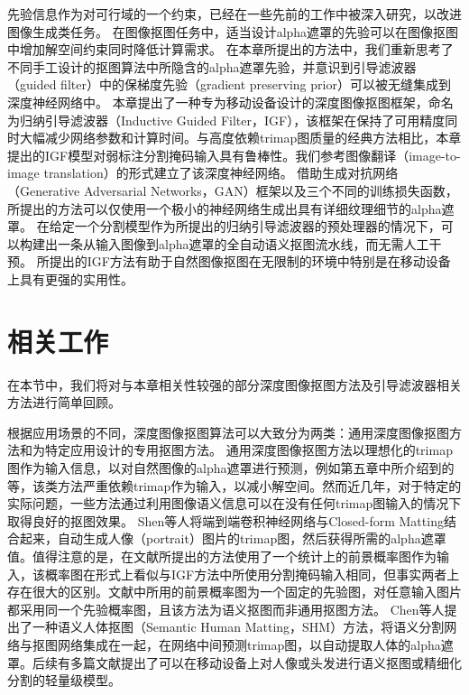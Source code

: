 先验信息作为对可行域的一个约束，已经在一些先前的工作中被深入研究，以改进图像生成类任务\cite{ulyanov2018deep}。
在图像抠图任务中，适当设计alpha遮罩的先验可以在图像抠图中增加解空间约束同时降低计算需求。
在本章所提出的方法中，我们重新思考了不同手工设计的抠图算法中所隐含的alpha遮罩先验，并意识到引导滤波器（guided filter）\cite{he2010guided}中的保梯度先验（gradient preserving prior）可以被无缝集成到深度神经网络中。
本章提出了一种专为移动设备设计的深度图像抠图框架，命名为归纳引导滤波器（Inductive Guided Filter，IGF），该框架在保持了可用精度同时大幅减少网络参数和计算时间。与高度依赖trimap图质量的经典方法相比，本章提出的IGF模型对弱标注分割掩码输入具有鲁棒性。我们参考图像翻译（image-to-image translation）的形式建立了该深度神经网络。
借助生成对抗网络（Generative Adversarial Networks，GAN）框架以及三个不同的训练损失函数，所提出的方法可以仅使用一个极小的神经网络生成出具有详细纹理细节的alpha遮罩。
在给定一个分割模型作为所提出的归纳引导滤波器的预处理器的情况下，可以构建出一条从输入图像到alpha遮罩的全自动语义抠图流水线，而无需人工干预。
所提出的IGF方法有助于自然图像抠图在无限制的环境中特别是在移动设备上具有更强的实用性。

\section{相关工作}
在本节中，我们将对与本章相关性较强的部分深度图像抠图方法及引导滤波器相关方法进行简单回顾。

根据应用场景的不同，深度图像抠图算法可以大致分为两类：通用深度图像抠图方法和为特定应用设计的专用抠图方法。
通用深度图像抠图方法以理想化的trimap图作为输入信息，以对自然图像的alpha遮罩进行预测，例如第五章中所介绍到的\parencite{cho2019deep,xu2017deep,lutz2018alphagan,cai2019disentangled,lu2019indices,hou2019context,samplenet}等，该类方法严重依赖trimap作为输入，以减小解空间。然而近几年，对于特定的实际问题，一些方法通过利用图像语义信息可以在没有任何trimap图输入的情况下取得良好的抠图效果。
Shen等人\cite{shen2016deep}将端到端卷积神经网络与Closed-form Matting\cite{levin2008closed}结合起来，自动生成人像（portrait）图片的trimap图，然后获得所需的alpha遮罩值。值得注意的是，在文献\parencite{shen2016deep}所提出的方法使用了一个统计上的前景概率图作为输入，该概率图在形式上看似与IGF方法中所使用分割掩码输入相同，但事实两者上存在很大的区别。文献\parencite{shen2016deep}中所用的前景概率图为一个固定的先验图，对任意输入图片都采用同一个先验概率图，且该方法为语义抠图而非通用抠图方法。
Chen等人\cite{chen2018semantic}提出了一种语义人体抠图（Semantic Human Matting，SHM）方法，将语义分割网络与抠图网络集成在一起，在网络中间预测trimap图，以自动提取人体的alpha遮罩。后续有多篇文献\cite{zhu2017fast,levinshtein2018real,chen2019boundary}提出了可以在移动设备上对人像或头发进行语义抠图或精细化分割的轻量级模型。

